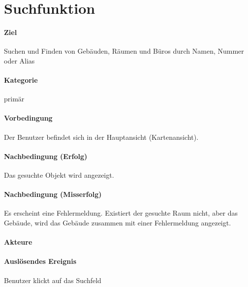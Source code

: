 \section{Suchfunktion}
\label{Suchfunktion}
\paragraph{Ziel}
Suchen und Finden von Gebäuden, Räumen und Büros durch Namen, Nummer oder Alias
\paragraph{Kategorie}
primär
\paragraph{Vorbedingung}
Der Benutzer befindet sich in der Hauptansicht (Kartenansicht).
\paragraph{Nachbedingung (Erfolg)}
Das gesuchte Objekt wird angezeigt.
\paragraph{Nachbedingung (Misserfolg)}
Es erscheint eine Fehlermeldung. Existiert der gesuchte Raum nicht, aber das Gebäude, wird das Gebäude zusammen mit einer Fehlermeldung angezeigt.
\paragraph{Akteure}

\paragraph{Auslösendes Ereignis}
Benutzer klickt auf das Suchfeld
